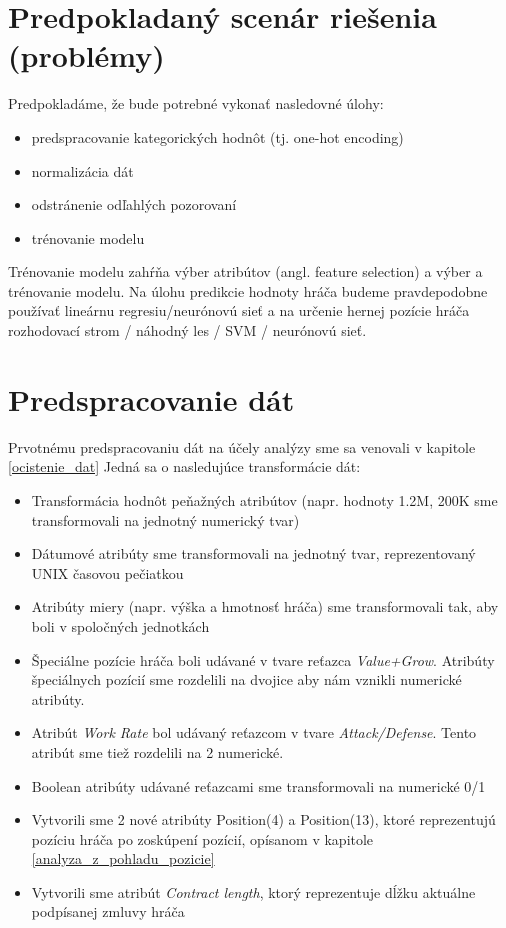 \documentclass[runningheads]{llncs}
\begin{document}
\section{Predpokladaný scenár riešenia (problémy)}

Predpokladáme, že bude potrebné vykonať nasledovné úlohy:
\begin{itemize}
    \item predspracovanie kategorických hodnôt (tj. one-hot encoding)
    \item normalizácia dát
    \item odstránenie odľahlých pozorovaní
    \item trénovanie modelu
\end{itemize}

Trénovanie modelu zahŕňa výber atribútov (angl. feature selection) a výber a trénovanie modelu. Na úlohu predikcie hodnoty hráča budeme pravdepodobne používať lineárnu regresiu/neurónovú sieť a na určenie hernej pozície hráča rozhodovací strom / náhodný les / SVM / neurónovú sieť.

\section{Predspracovanie dát}
Prvotnému predspracovaniu dát na účely analýzy sme sa venovali v kapitole \ref{ocistenie_dat}
Jedná sa o nasledujúce transformácie dát:
\begin{itemize}
    \item Transformácia hodnôt peňažných atribútov (napr. hodnoty 1.2M, 200K sme transformovali na jednotný numerický tvar)
    \item Dátumové atribúty sme transformovali na jednotný tvar, reprezentovaný UNIX časovou pečiatkou
    \item Atribúty miery (napr. výška a hmotnosť hráča) sme transformovali tak, aby boli v spoločných jednotkách
    \item Špeciálne pozície hráča boli udávané v tvare reťazca \textit{Value+Grow}. Atribúty špeciálnych pozícií sme rozdelili na dvojice aby nám vznikli numerické atribúty.
    \item Atribút \textit{Work Rate} bol udávaný reťazcom v tvare \textit{Attack/Defense}. Tento atribút sme tiež rozdelili na 2 numerické.
    \item Boolean atribúty udávané reťazcami sme transformovali na numerické 0/1
    \item Vytvorili sme 2 nové atribúty Position(4) a Position(13), ktoré reprezentujú pozíciu hráča po zoskúpení pozícií, opísanom v kapitole \ref{analyza_z_pohladu_pozicie}
    \item Vytvorili sme atribút \textit{Contract length}, ktorý reprezentuje dĺžku aktuálne podpísanej zmluvy hráča 
\end{itemize}
\end{document}
